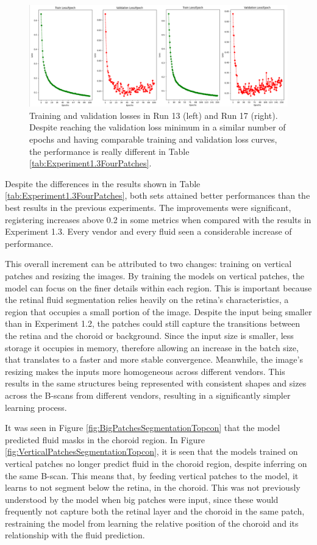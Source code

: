 \begin{figure}[!ht]
	\centering
	\includegraphics[width=1.0\linewidth]{figures/TrainingValidationLosses.png}
	\caption{Training and validation losses in Run 13 (left) and Run 17 (right). Despite reaching the validation loss minimum in a similar number of epochs and having comparable training and validation loss curves, the performance is really different in Table \ref{tab:Experiment1.3FourPatches}.}
	\label{fig:TrainingValidationLosses}
\end{figure}

Despite the differences in the results shown in Table \ref{tab:Experiment1.3FourPatches}, both sets attained better performances than the best results in the previous experiments. The improvements were significant, registering increases above 0.2 in some metrics when compared with the results in Experiment 1.3. Every vendor and every fluid seen a considerable increase of performance.
\par
This overall increment can be attributed to two changes: training on vertical patches and resizing the images. By training the models on vertical patches, the model can focus on the finer details within each region. This is important because the retinal fluid segmentation relies heavily on the retina's characteristics, a region that occupies a small portion of the image. Despite the input being smaller than in Experiment 1.2, the patches could still capture the transitions between the retina and the choroid or background. Since the input size is smaller, less storage it occupies in memory, therefore allowing an increase in the batch size, that translates to a faster and more stable convergence. Meanwhile, the image's resizing makes the inputs more homogeneous across different vendors. This results in the same structures being represented with consistent shapes and sizes across the B-scans from different vendors, resulting in a significantly simpler learning process.
\par
It was seen in Figure \ref{fig:BigPatchesSegmentationTopcon} that the model predicted fluid masks in the choroid region. In Figure \ref{fig:VerticalPatchesSegmentationTopcon}, it is seen that the models trained on vertical patches no longer predict fluid in the choroid region, despite inferring on the same B-scan. This means that, by feeding vertical patches to the model, it learns to not segment below the retina, in the choroid. This was not previously understood by the model when big patches were input, since these would frequently not capture both the retinal layer and the choroid in the same patch, restraining the model from learning the relative position of the choroid and its relationship with the fluid prediction.


